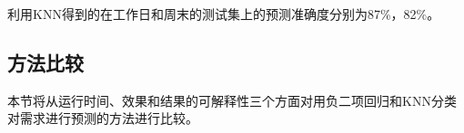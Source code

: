 \documentclass[]{tongjithesis}
\numberwithin{equation}{chapter}
\begin{document}
利用KNN得到的在工作日和周末的测试集上的预测准确度分别为87\%，82\%。

\subsection{方法比较}
本节将从运行时间、效果和结果的可解释性三个方面对用负二项回归和KNN分类对需求进行预测的方法进行比较。
\end{document}
